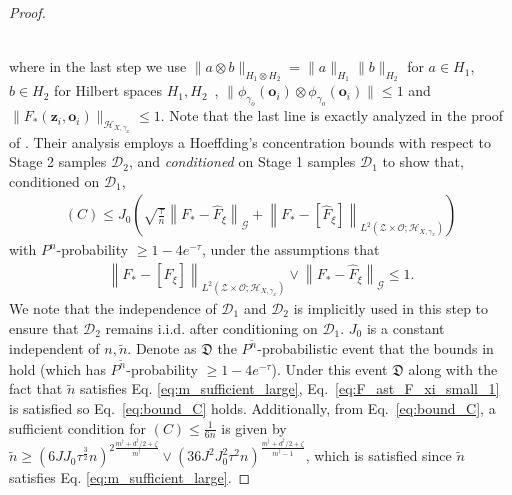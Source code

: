 \documentclass[11pt]{article}
\newcommand{\stageonesamples}{\tilde{n}}
\newcommand{\meffective}{m^{\dag}}
\newcommand{\deffective}{d^{\dag}}
\newcommand{\bz}{\mathbf z}
\newcommand{\bo}{\mathbf o}
\newcommand{\calZ}{\mathcal{Z}}
\newcommand{\calH}{\mathcal{H}}
\newcommand{\calG}{\mathcal{G}}
\newcommand{\calO}{\mathcal{O}}
\newcommand{\calD}{\mathcal{D}}
\newcommand{\0}{\mathbf{0}}
\begin{document}
\begin{appendix}
\begin{proof}
\begin{small}
\begin{align*}
\end{align*}
\end{small}
where in the last step we use $\|a\otimes b\|_{H_1\otimes H_2} = \|a\|_{H_1}\|b\|_{H_2}$ for $a\in H_1$, $b\in H_2$ for Hilbert spaces  $H_1,H_2$~\citep[Eq. (3)]{gretton2005measuring}, $\|\phi_{\gamma_o}(\bo_i) \otimes \phi_{\gamma_o}(\bo_i) \| \leq 1$ and $\|F_{\ast}(\bz_i,\bo_i)\|_{\calH_{X,\gamma_x}} \leq 1$. 
Note that the last line is exactly analyzed in the proof of \citet[Lemma 7]{meunier2024nonparametricinstrumentalregressionkernel}. Their analysis employs a Hoeffding's concentration bounds with respect to Stage 2 samples $\calD_2$, and \emph{conditioned} on Stage 1 samples $\calD_1$ to show that, conditioned on $\calD_1$, 
\begin{align}\label{eq:bound_C}
    (C) \leq J_0 \left( \sqrt{\frac{\tau}{n}}\left\|F_{\ast}-\hat{F}_{\xi}\right\|_{\calG}+\left\|F_*-[\hat{F}_{\xi}] \right\|_{L^2\left(\calZ\times\calO; \mathcal{H}_{X,\gamma_x}\right)}  \right)
\end{align}
with $P^n$-probability $\geq 1 - 4e^{-\tau}$, under the assumptions that 
\begin{align}\label{eq:F_ast_F_xi_small_1}
    \left\|F_\ast -[\hat{F}_{\xi}] \right\|_{L^2\left(\calZ\times\calO; \mathcal{H}_{X,\gamma_x}\right)} \vee \left\|F_\ast -\hat{F}_{\xi}\right\|_{\calG} \leq 1.
\end{align} 
We note that the independence of $\calD_1$ and $\calD_2$ is implicitly used in this step to ensure that $\calD_2$ remains i.i.d. after conditioning on $\calD_1$. $J_0$ is a constant independent of $n,\tilde{n}$.
Denote as $\mathfrak{D}$ the $P^{\tilde{n}}$-probabilistic event that the bounds in  hold (which has $P^{\tilde{n}}$-probability $\geq 1 - 4e^{-\tau}$). Under this event $\mathfrak{D}$ along with the fact that $\tilde{n}$ satisfies Eq. \eqref{eq:m_sufficient_large}, Eq.~\eqref{eq:F_ast_F_xi_small_1} is satisfied so Eq.~\eqref{eq:bound_C} holds. Additionally, from Eq.~\eqref{eq:bound_C}, a sufficient condition for $(C)\leq \frac{1}{6n}$ is given by $
\stageonesamples \geq (6 J J_0 \tau^{\frac{3}{2}} n)^{2\frac{\meffective+\deffective/2+\zeta}{\meffective}} \vee (36 J^2 J_0^2 \tau^2 n)^{\frac{\meffective + \deffective/2 + \zeta}{\meffective - 1}}$, which is satisfied since $\tilde{n}$ satisfies Eq. \eqref{eq:m_sufficient_large}.


\end{proof}
\end{appendix}
\end{document}
